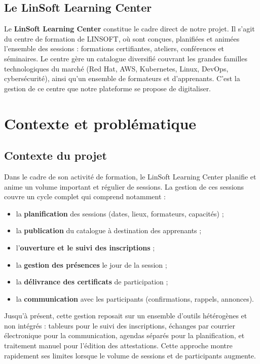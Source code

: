 \documentclass[12pt,a4paper,oneside]{report}
\begin{document}
\subsection{Le LinSoft Learning Center}
Le \textbf{LinSoft Learning Center} constitue le cadre direct de notre projet. Il s'agit du
centre de formation de LINSOFT, où sont conçues, planifiées et animées l'ensemble des
sessions : formations certifiantes, ateliers, conférences et séminaires. Le centre gère un
catalogue diversifié couvrant les grandes familles technologiques du marché (Red Hat, AWS,
Kubernetes, Linux, DevOps, cybersécurité), ainsi qu'un ensemble de formateurs et
d'apprenants. C'est la gestion de ce centre que notre plateforme se propose de digitaliser.

\section{Contexte et problématique}

\subsection{Contexte du projet}
Dans le cadre de son activité de formation, le LinSoft Learning Center planifie et anime un
volume important et régulier de sessions. La gestion de ces sessions couvre un cycle complet
qui comprend notamment :

\begin{itemize}[leftmargin=1.2cm]
  \item la \textbf{planification} des sessions (dates, lieux, formateurs, capacités) ;
  \item la \textbf{publication} du catalogue à destination des apprenants ;
  \item l'\textbf{ouverture et le suivi des inscriptions} ;
  \item la \textbf{gestion des présences} le jour de la session ;
  \item la \textbf{délivrance des certificats} de participation ;
  \item la \textbf{communication} avec les participants (confirmations, rappels, annonces).
\end{itemize}

Jusqu'à présent, cette gestion reposait sur un ensemble d'outils hétérogènes et non
intégrés : tableurs pour le suivi des inscriptions, échanges par courrier électronique pour la
communication, agendas séparés pour la planification, et traitement manuel pour l'édition des
attestations. Cette approche montre rapidement ses limites lorsque le volume de sessions et
de participants augmente.
\end{document}
